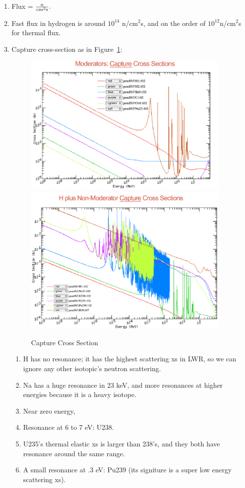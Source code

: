 \documentclass{school-22.211-notes}
\begin{document}
\begin{enumerate}
\item Flux = $\frac{n}{\mathrm{cm}^2 \mathrm{s}}.$

\item Fast flux in hydrogen is around $10^{14}$ n/cm$^2$s, and on the order of $10^{12}$n/cm$^2$s for thermal flux. 

\item Capture cross-section as in Figure~\ref{capture-xs}: 
\begin{figure}
  \centering
  \includegraphics[width=4in]{images/capture-xs.png}
  \\
  \includegraphics[width=4in]{images/capture-xs-2.png}
  \caption{Capture Cross Section} \label{capture-xs}
\end{figure}
\begin{enumerate}
\item H has no resonance; it has the highest scattering xs in LWR, so we can ignore any other isotopic's neutron scattering.   
\item Na has a huge resonance in 23 keV, and more resonances at higher energies because it is a heavy isotope.
\item Near zero energy,
\item Resonance at 6 to 7 eV: U238. 
\item U235's thermal elastic xs is larger than 238's, and they both have resonance around the same range.   
\item A small resonance at .3 eV: Pu239 (its signiture is a super low energy scattering xs). 
\end{enumerate}


\end{enumerate}
\end{document}
